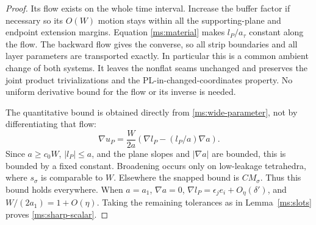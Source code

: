\begin{proof}
Its flow exists on the whole time interval.  Increase the buffer
factor if necessary so its $O(W)$ motion stays within all the
supporting-plane and endpoint extension margins.  Equation
\eqref{ms:material} makes $l_P/a_\tau$ constant along the flow.
The backward flow gives the converse, so all strip boundaries and
all layer parameters are transported exactly.  In particular this
is a common ambient change of both systems.  It leaves the
nonflat seams unchanged and preserves the joint product
trivializations and the PL-in-changed-coordinates property.
No uniform derivative bound for the flow or its inverse is needed.

The quantitative bound is obtained directly from
\eqref{ms:wide-parameter}, not by differentiating that flow:
\[
 \nabla u_P
   =\frac W{2a}\left(\nabla l_P-(l_P/a)\nabla a\right).
\]
Since $a\ge c_0W$, $|l_P|\le a$, and the plane slopes and
$|\nabla a|$ are bounded, this is bounded by a fixed constant.
Broadening occurs only on low-leakage tetrahedra, where
$s_\sigma$ is comparable to $W$.  Elsewhere the snapped bound is
$CM_\sigma$.  Thus this bound holds everywhere.  When $a=a_1$,
$\nabla a=0$, $\nabla l_P=\epsilon_je_i+O_\eta(\delta')$, and
$W/(2a_1)=1+O(\eta)$.  Taking the remaining tolerances as in
Lemma~\ref{ms:slots} proves \eqref{ms:sharp-scalar}.
\end{proof}

